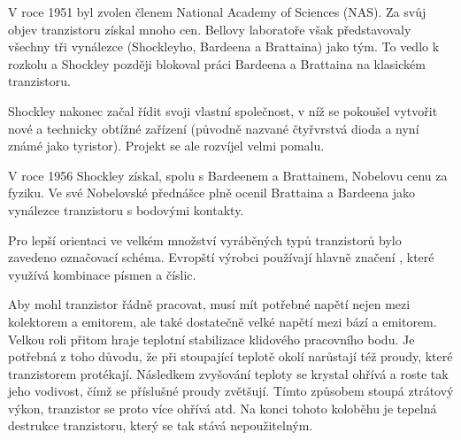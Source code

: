 \begin{mdframed}[style=mdnote]
      {\centering
        \captionsetup{type=figure}
      \par}

      V roce 1951 byl zvolen členem National Academy of Sciences (NAS). Za svůj objev tranzistoru
      získal mnoho cen. Bellovy laboratoře však představovaly všechny tři vynálezce (Shockleyho,
      Bardeena a Brattaina) jako tým. To vedlo k rozkolu a Shockley později blokoval práci Bardeena
      a Brattaina na klasickém tranzistoru.

      Shockley nakonec začal řídit svoji vlastní společnost, v níž se pokoušel vytvořit nové a
      technicky obtížné zařízení (původně nazvané čtyřvrstvá dioda a nyní známé jako tyristor).
      Projekt se ale rozvíjel velmi pomalu. 

      V roce 1956 Shockley získal, spolu s Bardeenem a Brattainem, Nobelovu cenu za fyziku. Ve své
      Nobelovské přednášce plně ocenil Brattaina a Bardeena jako vynálezce tranzistoru s bodovými
      kontakty.
    \end{mdframed}
    
    Pro lepší orientaci ve velkém množství vyráběných typů tranzistorů bylo zavedeno označovací
    schéma. Evropští výrobci používají hlavně značení ,
    které využívá kombinace písmen a číslic.


    Aby mohl tranzistor řádně pracovat, musí mít potřebné napětí nejen mezi kolektorem a emitorem,
    ale také dostatečně velké napětí mezi bází a emitorem. Velkou roli přitom hraje teplotní
    stabilizace klidového pracovního bodu. Je potřebná z toho důvodu, že při stoupající teplotě
    okolí narůstají též proudy, které tranzistorem protékají. Následkem zvyšování teploty se krystal
    ohřívá a roste tak jeho vodivost, čímž se příslušné proudy zvětšují. Tímto způsobem stoupá
    ztrátový výkon, tranzistor se proto více ohřívá atd. Na konci tohoto koloběhu je tepelná
    destrukce tranzistoru, který se tak stává nepoužitelným.

